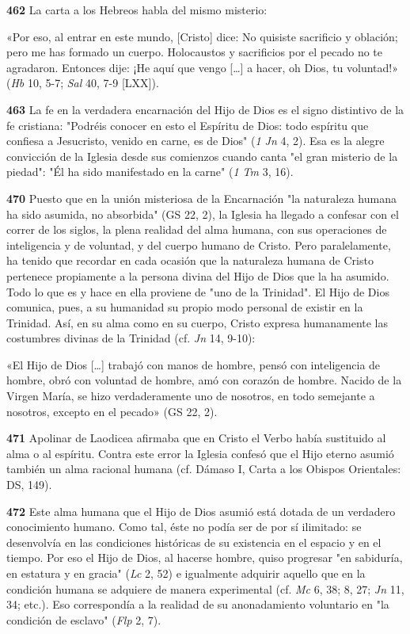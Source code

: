 \documentclass[]{article}
\begin{document}
\textbf{462} La carta a los Hebreos habla del mismo misterio:

«Por eso, al entrar en este mundo, {[}Cristo{]} dice: No quisiste
sacrificio y oblación; pero me has formado un cuerpo. Holocaustos y
sacrificios por el pecado no te agradaron. Entonces dije: ¡He aquí que
vengo [\ldots{}] a hacer, oh Dios, tu voluntad!» (\emph{Hb} 10, 5-7;
\emph{Sal} 40, 7-9 {[}LXX{]}).

\textbf{463} La fe en la verdadera encarnación del Hijo de Dios es el
signo distintivo de la fe cristiana: "Podréis conocer en esto el
Espíritu de Dios: todo espíritu que confiesa a Jesucristo, venido en
carne, es de Dios" (\emph{1 Jn} 4, 2). Esa es la alegre convicción de la
Iglesia desde sus comienzos cuando canta "el gran misterio de la
piedad": "Él ha sido manifestado en la carne" (\emph{1 Tm} 3, 16).

\textbf{470} Puesto que en la unión misteriosa de la Encarnación "la
naturaleza humana ha sido asumida, no absorbida" (GS 22, 2), la Iglesia
ha llegado a confesar con el correr de los siglos, la plena realidad del
alma humana, con sus operaciones de inteligencia y de voluntad, y del
cuerpo humano de Cristo. Pero paralelamente, ha tenido que recordar en
cada ocasión que la naturaleza humana de Cristo pertenece propiamente a
la persona divina del Hijo de Dios que la ha asumido. Todo lo que es y
hace en ella proviene de "uno de la Trinidad". El Hijo de Dios comunica,
pues, a su humanidad su propio modo personal de existir en la Trinidad.
Así, en su alma como en su cuerpo, Cristo expresa humanamente las
costumbres divinas de la Trinidad (cf. \emph{Jn} 14, 9-10):

«El Hijo de Dios [\ldots{}] trabajó con manos de hombre, pensó con
inteligencia de hombre, obró con voluntad de hombre, amó con corazón de
hombre. Nacido de la Virgen María, se hizo verdaderamente uno de
nosotros, en todo semejante a nosotros, excepto en el pecado» (GS 22,
2).

\textbf{471} Apolinar de Laodicea afirmaba que en Cristo el Verbo había
sustituido al alma o al espíritu. Contra este error la Iglesia confesó
que el Hijo eterno asumió también un alma racional humana (cf. Dámaso I,
Carta a los Obispos Orientales: DS, 149).

\textbf{472} Este alma humana que el Hijo de Dios asumió está dotada de
un verdadero conocimiento humano. Como tal, éste no podía ser de por sí
ilimitado: se desenvolvía en las condiciones históricas de su existencia
en el espacio y en el tiempo. Por eso el Hijo de Dios, al hacerse
hombre, quiso progresar "en sabiduría, en estatura y en gracia"
(\emph{Lc} 2, 52) e igualmente adquirir aquello que en la condición
humana se adquiere de manera experimental (cf. \emph{Mc} 6, 38; 8, 27;
\emph{Jn} 11, 34; etc.). Eso correspondía a la realidad de su
anonadamiento voluntario en "la condición de esclavo" (\emph{Flp} 2, 7).
\end{document}
